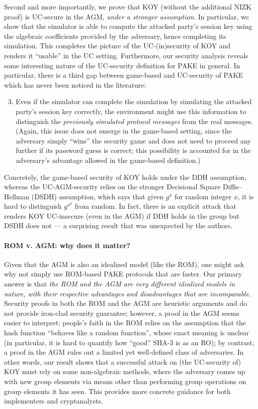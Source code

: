Second and more importantly, we prove that KOY (without the additional NIZK proof) is UC-secure in the AGM, \emph{under a stronger assumption}. In particular, we show that the simulator is able to compute the attacked party's session key using the algebraic coefficients provided by the adversary, hence completing its simulation. This completes the picture of the UC-(in)security of KOY and renders it ``usable'' in the UC setting. Furthermore, our security analysis reveals some interesting nature of the UC-security definition for PAKE in general. In particular, there is a third gap between game-based and UC-security of PAKE which has never been noticed in the literature:
\begin{enumerate}\setcounter{enumi}{2}
  \item Even if the simulator can complete the simulation by simulating the attacked party's session key correctly, the environment might use this information to distinguish the \emph{previously simulated protocol messages} from the real messages. (Again, this issue does not emerge in the game-based setting, since the adversary simply ``wins'' the security game and does not need to proceed any further if its password guess is correct; this possibility is accounted for in the adversary's advantage allowed in the game-based definition.)
\end{enumerate}
Concretely, the game-based security of KOY holds under the DDH assumption, whereas the UC-AGM-security relies on the stronger Decisional Square Diffie--Hellman (DSDH) assumption, which says that given $g^x$ for random integer $x$, it is hard to distinguish $g^{x^2}$ from random. In fact, there is an explicit attack that renders KOY UC-insecure (even in the AGM) if DDH holds in the group but DSDH does not --- a surprising result that was unexpected by the authors.

\paragraph{ROM v. AGM: why does it matter?}
Given that the AGM is also an idealized model (like the ROM), one might ask why not simply use ROM-based PAKE protocols that are faster. Our primary answer is that \emph{the ROM and the AGM are very different idealized models in nature, with their respective advantages and disadvantages that are incomparable}. Security proofs in both the ROM and the AGM are heuristic arguments and do not provide iron-clad security guarantee; however, a proof in the AGM seems easier to interpret: people's faith in the ROM relies on the assumption that the hash function ``behaves like a random function'', whose exact meaning is unclear (in particular, it is hard to quantify how ``good'' SHA-3 is as an RO); by contrast, a proof in the AGM rules out a limited yet well-defined class of adversaries. In other words, our result shows that a successful attack on (the UC-security of) KOY must rely on some non-algebraic methods, where the adversary comes up with new group elements via means other than performing group operations on group elements it has seen. This provides more concrete guidance for both implementers and cryptanalysts.

